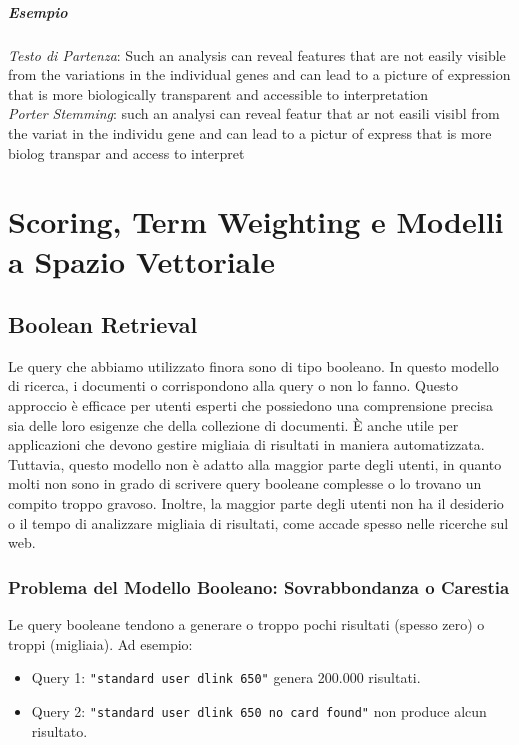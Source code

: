 \documentclass{report}
\begin{document}
	\paragraph{Esempio}
	\textit{Testo di Partenza}: Such an analysis can reveal features that are not easily visible from the variations in the individual genes and can lead to a picture of expression that is more biologically transparent and accessible to interpretation
	\vspace{\baselineskip}\\
	\textit{Porter Stemming}: such an analysi can reveal featur that ar not easili visibl from the variat in the individu gene and can lead to a pictur of express that is more biolog transpar and access to interpret

	\chapter{Scoring, Term Weighting e Modelli a Spazio Vettoriale}
	\section{Boolean Retrieval}
	Le query che abbiamo utilizzato finora sono di tipo booleano. In questo modello di ricerca, i documenti o corrispondono alla query o non lo fanno. Questo approccio è efficace per utenti esperti che possiedono una comprensione precisa sia delle loro esigenze che della collezione di documenti. È anche utile per applicazioni che devono gestire migliaia di risultati in maniera automatizzata.
	\vspace{\baselineskip}\\
	Tuttavia, questo modello non è adatto alla maggior parte degli utenti, in quanto molti non sono in grado di scrivere query booleane complesse o lo trovano un compito troppo gravoso. Inoltre, la maggior parte degli utenti non ha il desiderio o il tempo di analizzare migliaia di risultati, come accade spesso nelle ricerche sul web.

	\subsection{Problema del Modello Booleano: Sovrabbondanza o Carestia}
	Le query booleane tendono a generare o troppo pochi risultati (spesso zero) o troppi (migliaia). Ad esempio:

	\begin{itemize}
    	\item Query 1: \texttt{"standard user dlink 650"} genera 200.000 risultati.
    	\item Query 2: \texttt{"standard user dlink 650 no card found"} non produce alcun risultato.
	\end{itemize}
\end{document}
